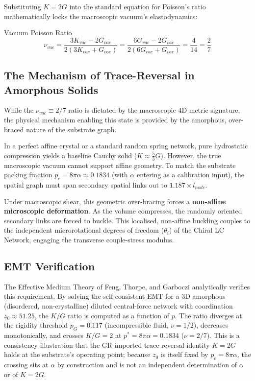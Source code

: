 Substituting $K = 2G$ into the standard equation for Poisson's ratio mathematically locks the macroscopic vacuum's elastodynamics:
\begin{resultbox}{Vacuum Poisson Ratio}
\begin{equation}
\nu_{vac} = \frac{3K_{vac} - 2G_{vac}}{2(3K_{vac} + G_{vac})} = \frac{6G_{vac} - 2G_{vac}}{2(6G_{vac} + G_{vac})} = \frac{4}{14} = \frac{2}{7}
\end{equation}
\end{resultbox}

\subsection{The Mechanism of Trace-Reversal in Amorphous Solids}
While the $\nu_{vac} \equiv 2/7$ ratio is dictated by the macroscopic 4D metric signature, the physical mechanism enabling this state is provided by the amorphous, over-braced nature of the substrate graph.

In a perfect affine crystal or a standard random spring network, pure hydrostatic compression yields a baseline Cauchy solid ($K \approx \frac{5}{3}G$). However, the true macroscopic vacuum cannot support affine geometry. To match the substrate packing fraction $p_c = 8\pi\alpha \approx 0.1834$ (with $\alpha$ entering as a calibration input), the spatial graph must span secondary spatial links out to $1.187 \times l_{node}$.

Under macroscopic shear, this geometric over-bracing forces a \textbf{non-affine microscopic deformation}. As the volume compresses, the randomly oriented secondary links are forced to buckle. This localised, non-affine buckling couples to the independent microrotational degrees of freedom ($\theta_i$) of the Chiral LC Network, engaging the transverse couple-stress modulus. 

\subsection{EMT Verification}
The Effective Medium Theory of Feng, Thorpe, and Garboczi analytically verifies this requirement. By solving the self-consistent EMT for a 3D amorphous (disordered, non-crystalline) diluted central-force network with coordination $z_0 \approx 51.25$, the $K/G$ ratio is computed as a function of $p$. The ratio diverges at the rigidity threshold $p_G = 0.117$ (incompressible fluid, $\nu = 1/2$), decreases monotonically, and crosses $K/G = 2$ at $p^* = 8\pi\alpha = 0.1834$ ($\nu = 2/7$). This is a consistency illustration that the GR-imported trace-reversal identity $K=2G$ holds at the substrate's operating point; because $z_0$ is itself fixed by $p_c = 8\pi\alpha$, the crossing sits at $\alpha$ by construction and is not an independent determination of $\alpha$ or of $K=2G$.

